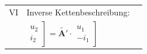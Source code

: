 \documentclass[6pt,a4paper]{scrartcl}
\newcommand{\ma}[1]{\ensuremath{\utilde{\boldsymbol {#1}}}}
\begin{document}
\begin{multicols}{3}
\begin{tabular}{cll}
	VI & Inverse Kettenbeschreibung:\\
	& $\left.\begin{matrix} u_2\\ i_2\end{matrix}\right]=\ma{A'} \cdot \left.\begin{matrix} u_1\\ -i_1 \end{matrix}\right]$\\
	\end{tabular}

\end{multicols}

\end{document}
